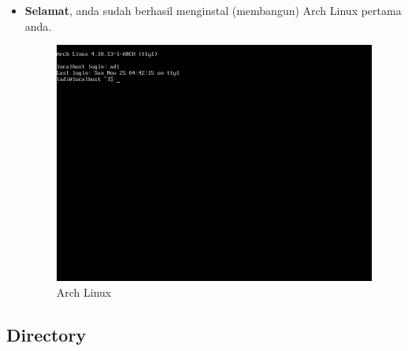 \documentclass[12pt,]{article}
\begin{document}
\begin{itemize}
		\item \textbf{Selamat}, anda sudah berhasil menginstal (membangun) Arch Linux pertama anda.
		\begin{figure}[H]
			\centering
			\includegraphics[width=0.6\linewidth]{images/vbox_afterinstall/s5}
			\caption{Arch Linux}
		\end{figure}
	\end{itemize} 

	\subsection{Directory}	
	
\end{document}
